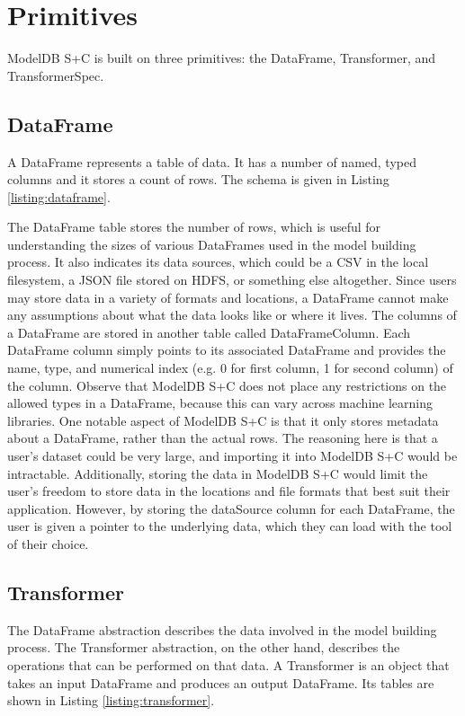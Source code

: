 \section{Primitives}
ModelDB S+C is built on three primitives: the DataFrame, Transformer, and 
TransformerSpec.

\subsection{DataFrame}

A DataFrame represents a table of data. It has a number of named, typed columns
and it stores a count of rows. The schema is given in Listing \ref{listing:dataframe}.

The DataFrame table stores the number of rows, which is useful for
understanding the sizes of various DataFrames used in the model building process.
It also indicates its data sources, which could be a CSV in the local filesystem,
a JSON file stored on HDFS, or something else altogether. Since users may store
data in a variety of formats and locations, a DataFrame cannot make any assumptions
about what the data looks like or where it lives. The columns of a DataFrame
are stored in another table called DataFrameColumn. Each DataFrame column simply
points to its associated DataFrame and provides the name, type, and numerical index
(e.g. 0 for first column, 1 for second column) of the column. Observe that ModelDB S+C does
not place any restrictions on the allowed types in a DataFrame, because this
can vary across machine learning libraries. One notable aspect of ModelDB S+C
is that it only stores metadata about a DataFrame, rather than the actual rows.
The reasoning here is that a user's dataset could be very large, and importing it
into ModelDB S+C would be intractable. Additionally, storing the data in ModelDB
S+C would limit the user's freedom to store data in the locations and file formats
that best suit their application. However, by storing the dataSource column for
each DataFrame, the user is given a pointer to the underlying data, which they can
load with the tool of their choice.

\subsection{Transformer} 
The DataFrame abstraction describes the data involved in the model building process.
The Transformer abstraction, on the other hand, describes the operations that can
be performed on that data. A Transformer is an object that takes an input DataFrame
and produces an output DataFrame. Its tables are shown in Listing \ref{listing:transformer}.

